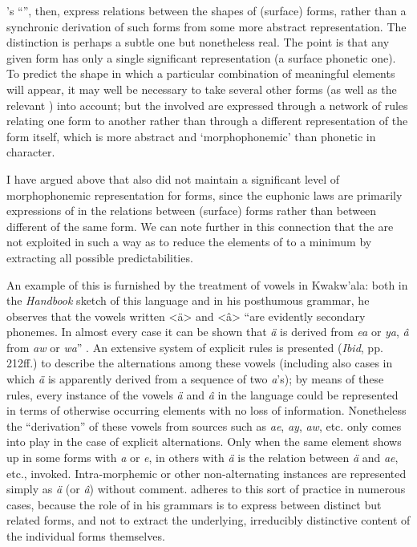 {\Boas}'s ``'', then, express relations between the shapes of
(surface) forms, rather than a synchronic derivation of such forms
from some more abstract representation. The distinction is perhaps a
subtle one but nonetheless real. The point is that any given form has
only a single significant representation (a surface phonetic one). To
predict the shape in which a particular combination of meaningful
elements will appear, it may well be necessary to take several other
forms (as well as the relevant ) into account; but the
 involved are expressed through a network of rules
relating one form to another rather than through a different
representation of the form itself, which is more abstract and
`morphophonemic' than phonetic in character.

I have argued above that {\Boas} also did not maintain a significant
level of morphophonemic representation for forms, since the euphonic
laws are primarily expressions of  in the relations
between (surface) forms rather than between different 
of the same form. We can note further in this connection that the
 are not exploited in such a way as to reduce the
elements of  to a minimum by extracting all possible
predictabilities.

An example of this is furnished by the treatment of vowels in
Kwakw'ala: both in the \textsl{Handbook} sketch of this language and
in his posthumous grammar, he observes that the vowels written <ä> and
<â> ``are evidently secondary phonemes. In almost every case it can be
shown that \emph{ä} is derived from \emph{ea} or \emph{ya}, \emph{â}
from \emph{aw} or \emph{wa}'' \citep[207]{boas47:kwakiutl}. An
extensive system of explicit rules is presented (\emph{Ibid},
pp. 212ff.) to describe the alternations among these vowels (including
also cases in which \emph{ä} is apparently derived from a sequence of
two \emph{a}'s); by means of these rules, every instance of the vowels
\emph{ä} and \emph{â} in the language could be represented in terms of
otherwise occurring elements with no loss of information. Nonetheless
the ``derivation'' of these vowels from sources such as \emph{ae},
\emph{ay}, \emph{aw}, etc. only comes into play in the case of
explicit alternations. Only when the same element shows up in some
forms with \emph{a} or \emph{e}, in others with \emph{ä} is the
relation between \emph{ä} and \emph{ae}, etc.,
invoked. Intra-morphemic or other non-alternating instances are
represented simply as \emph{ä} (or \emph{â}) without comment. {\Boas}
adheres to this sort of practice in numerous cases, because the role
of  in his grammars is to express 
between distinct but related forms, and not to extract the underlying,
irreducibly distinctive content of the individual forms themselves.

